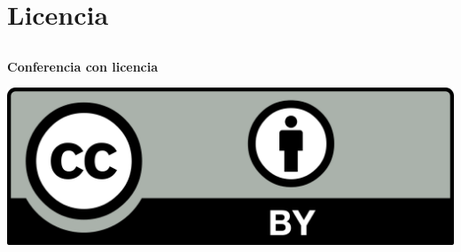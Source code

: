 %
%

\section{Licencia}

\subsection{}
\begin{frame}
    \frametitle{}
    \begin{center}
        \textbf{Conferencia con licencia}\par
        \indent\par
        \includegraphics[width=\textwidth]{CC-BY.png}
    \end{center}
\end{frame}

